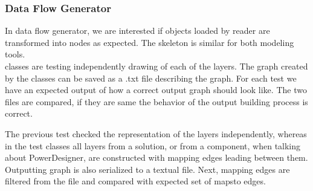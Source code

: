 \subsubsection{Data Flow Generator}

In data flow generator, we are interested if objects loaded by reader are transformed into nodes as expected.
The skeleton is similar for both modeling tools. \\

 classes are testing independently drawing of each of the layers. The graph created by the  classes can be saved as a .txt file describing the graph. 
For each test we have an expected output of how a correct output graph should look like. The two files are compared, if they are same the behavior of the output building process is correct.

The previous test checked the representation of the layers independently, whereas in the test classes  all layers from a solution, or from a component, when talking about PowerDesigner, are constructed with mapping edges leading between them. Outputting graph is also serialized to a textual file. Next, mapping edges are filtered from the file and compared with expected set of maps\textunderscore to edges. 